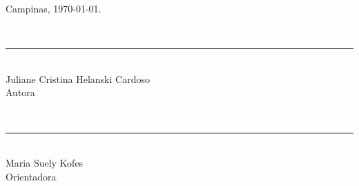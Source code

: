 \vspace{1.5cm}

\noindent Campinas, \today.

\vspace{2cm}

\begin{center}
  \begin{minipage}{0.45\textwidth}
    \centering
    \rule{0pt}{1.2cm}\\[-0.35cm] %
    \rule{\textwidth}{0.5pt}\\
    Juliane Cristina Helanski Cardoso\\
    \small Autora
  \end{minipage}
  \hfill
  \begin{minipage}{0.45\textwidth}
    \centering
    \rule{0pt}{1.2cm}\\[-0.35cm] %
    \rule{\textwidth}{0.5pt}\\
    Maria Suely Kofes\\
    \small Orientadora
  \end{minipage}
\end{center}